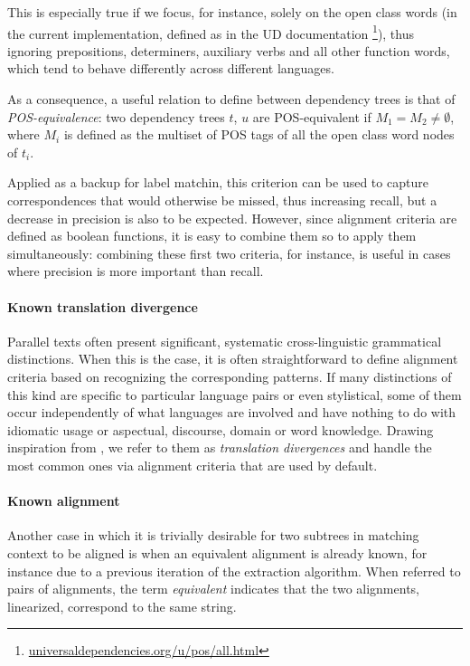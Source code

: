 \documentclass[11pt]{article}
\begin{document}
This is especially true if we focus, for instance, solely on the open class words (in the current implementation, defined as in the UD documentation \footnote{\url{universaldependencies.org/u/pos/all.html}}), thus ignoring prepositions, determiners, auxiliary verbs and all other function words, which tend to behave differently across different languages.

As a consequence, a useful relation to define between dependency trees is that of \textit{POS-equivalence}: two dependency trees $t$, $u$ are POS-equivalent if $M_1 = M_2 \neq \emptyset$, where $M_i$ is defined as the multiset of POS tags of all the open class word nodes of $t_i$. 

Applied as a backup for label matchin, this criterion can be used to capture correspondences that would otherwise be missed, thus increasing recall, but a decrease in precision is also to be expected. 
However, since alignment criteria are defined as boolean functions, it is easy to combine them so to apply them simultaneously: combining these first two criteria, for instance, is useful in cases where precision is more important than recall.

\paragraph{Known translation divergence}
Parallel texts often present significant, systematic cross-linguistic grammatical distinctions. 
When this is the case, it is often straightforward to define alignment criteria based on recognizing the corresponding patterns.
If many distinctions of this kind are specific to particular language pairs or even stylistical, some of them occur independently of what languages are involved and have nothing to do with idiomatic usage or aspectual, discourse, domain or word knowledge. Drawing inspiration from \cite{dorr-1994-machine}, we refer to them as \textit{translation divergences} and handle the most common ones via alignment criteria that are used by default. 


\paragraph{Known alignment} \label{ka}
Another case in which it is trivially desirable for two subtrees in matching context to be aligned is when an equivalent alignment is already known, for instance due to a previous iteration of the extraction algorithm. 
When referred to pairs of alignments, the term \textit{equivalent} indicates that the two alignments, linearized, correspond to the same string.
\end{document}
